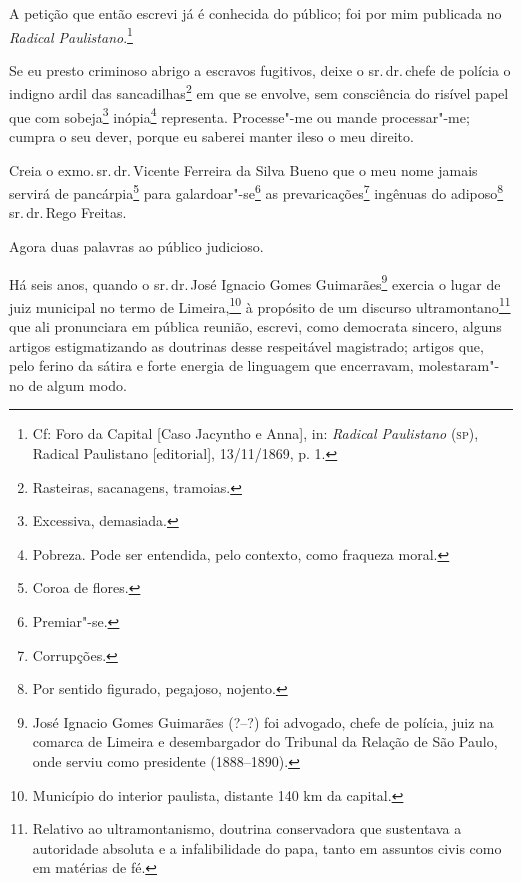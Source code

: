 A petição que então escrevi já é conhecida do público; foi por mim
publicada no \emph{Radical Paulistano}.\footnote{Cf: Foro da Capital
  {[}Caso Jacyntho e Anna{]}, in: \emph{Radical Paulistano} (\textsc{sp}),
  Radical Paulistano {[}editorial{]}, 13/11/1869, p. 1.}


Se eu presto criminoso abrigo a escravos fugitivos, deixe o sr.\,dr.\,chefe de polícia o indigno ardil das sancadilhas\footnote{Rasteiras,
  sacanagens, tramoias.} em que se envolve, sem consciência do risível
papel que com sobeja\footnote{Excessiva, demasiada.} inópia\footnote{
  Pobreza. Pode ser entendida, pelo contexto, como fraqueza moral.}
representa. Processe"-me ou mande processar"-me; cumpra o seu dever,
porque eu saberei manter ileso o meu direito.

Creia o exmo.\,sr.\,dr.\,Vicente Ferreira da Silva Bueno que o meu nome
jamais servirá de pancárpia\footnote{Coroa de flores.} para
galardoar"-se\footnote{Premiar"-se.} as prevaricações\footnote{
  Corrupções.} ingênuas do adiposo\footnote{Por sentido figurado,
  pegajoso, nojento.} sr.\,dr.\,Rego Freitas.

Agora duas palavras ao público judicioso.

Há seis anos, quando o sr.\,dr.\,José Ignacio Gomes Guimarães\footnote{
  José Ignacio Gomes Guimarães (?--?) foi advogado, chefe de polícia,
  juiz na comarca de Limeira e desembargador do Tribunal da Relação de
  São Paulo, onde serviu como presidente (1888--1890).} exercia o lugar
de juiz municipal no termo de Limeira,\footnote{Município do interior
  paulista, distante 140 km da capital.} à propósito de um discurso
ultramontano\footnote{Relativo ao ultramontanismo, doutrina
  conservadora que sustentava a autoridade absoluta e a infalibilidade
  do papa, tanto em assuntos civis como em matérias de fé.} que ali
pronunciara em pública reunião, escrevi, como democrata sincero, alguns
artigos estigmatizando as doutrinas desse respeitável magistrado;
artigos que, pelo ferino da sátira e forte energia de linguagem que
encerravam, molestaram"-no de algum modo.

